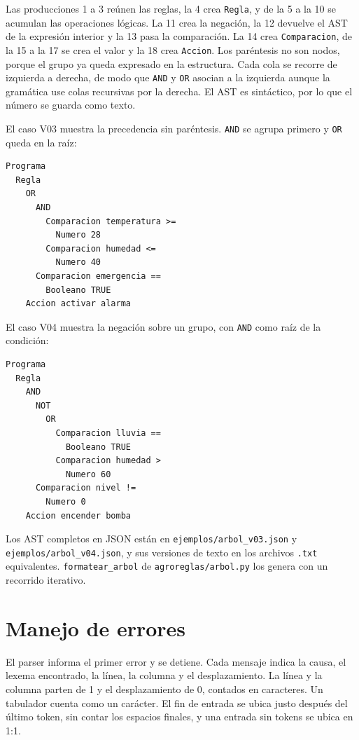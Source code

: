 \documentclass[11pt,a4paper]{article}
\newcommand{\tk}[1]{\texttt{#1}}
\begin{document}
Las producciones 1 a 3 reúnen las reglas, la 4 crea \texttt{Regla},
y de la 5 a la 10 se acumulan las operaciones lógicas. La 11 crea
la negación, la 12 devuelve el AST de la expresión interior y la 13
pasa la comparación. La 14 crea \texttt{Comparacion}, de la 15 a la
17 se crea el valor y la 18 crea \texttt{Accion}. Los paréntesis no
son nodos, porque el grupo ya queda expresado en la estructura.
Cada cola se recorre de izquierda a derecha, de modo que \tk{AND} y
\tk{OR} asocian a la izquierda aunque la gramática use colas
recursivas por la derecha. El AST es sintáctico, por lo que el
número se guarda como texto.

El caso V03 muestra la precedencia sin paréntesis. \tk{AND} se
agrupa primero y \tk{OR} queda en la raíz:

\begin{Verbatim}
Programa
  Regla
    OR
      AND
        Comparacion temperatura >=
          Numero 28
        Comparacion humedad <=
          Numero 40
      Comparacion emergencia ==
        Booleano TRUE
    Accion activar alarma
\end{Verbatim}

El caso V04 muestra la negación sobre un grupo, con \tk{AND} como
raíz de la condición:

\begin{Verbatim}
Programa
  Regla
    AND
      NOT
        OR
          Comparacion lluvia ==
            Booleano TRUE
          Comparacion humedad >
            Numero 60
      Comparacion nivel !=
        Numero 0
    Accion encender bomba
\end{Verbatim}

Los AST completos en JSON están en
\texttt{ejemplos/arbol\_v03.json} y
\texttt{ejemplos/arbol\_v04.json}, y sus versiones de texto en los
archivos \texttt{.txt} equivalentes. \texttt{formatear\_arbol} de
\texttt{agroreglas/arbol.py} los genera con un recorrido iterativo.

\section{Manejo de errores}
\label{sec:errores}

El parser informa el primer error y se detiene. Cada mensaje indica
la causa, el lexema encontrado, la línea, la columna y el
desplazamiento. La línea y la columna parten de 1 y el
desplazamiento de 0, contados en caracteres. Un tabulador cuenta
como un carácter. El fin de entrada se ubica justo después del
último token, sin contar los espacios finales, y una entrada sin
tokens se ubica en 1:1.
\end{document}
